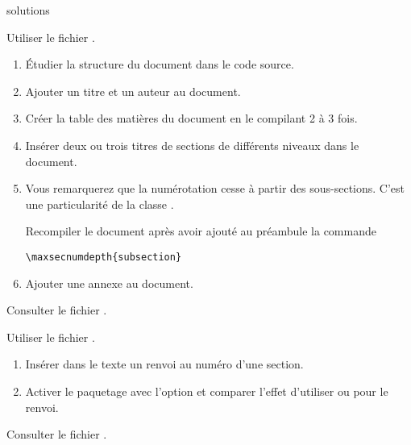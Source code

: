 {{\begin{Filesave}{solutions}
\end{Filesave}

\begin{exercice}
  Utiliser le fichier .
  \begin{enumerate}
  \item Étudier la structure du document dans le code source.
  \item Ajouter un titre et un auteur au document.
  \item Créer la table des matières du document en le compilant 2 à 3
    fois.
  \item Insérer deux ou trois titres de sections de différents niveaux
    dans le document.
  \item Vous remarquerez que la numérotation cesse à partir des
    sous-sections. C'est une particularité de la classe
    .

    Recompiler le document après avoir ajouté au préambule la commande
\begin{lstlisting}
\maxsecnumdepth{subsection}
\end{lstlisting}
  \item Ajouter une annexe au document.
  \end{enumerate}
  \begin{sol}
    Consulter le fichier .
  \end{sol}
\end{exercice}

\begin{exercice}
  Utiliser le fichier .
  \begin{enumerate}
  \item Insérer dans le texte un renvoi au numéro d'une section.
  \item Activer le paquetage  avec l'option
     et comparer l'effet d'utiliser \cmd{\ref} ou
    \cmd{\autoref} pour le renvoi.
  \end{enumerate}
  \begin{sol}
    Consulter le fichier .
  \end{sol}
\end{exercice}

}}

